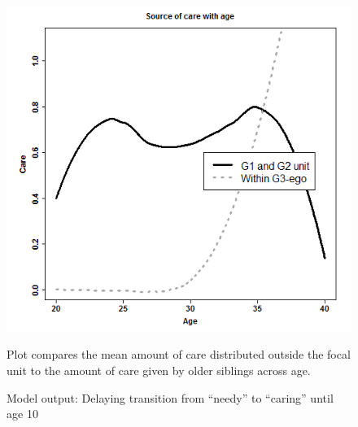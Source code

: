 \documentclass[10pt]{article}
\begin{document}
\begin{figure}[h]
\caption{Model output: Delaying transition from ``needy'' to ``caring'' until age 10} \label{fig:supp33} 
    \centering
    \includegraphics[scale=0.65]{need_till_10}

{Plot compares the mean amount of care distributed outside the focal unit to the amount of care given by older siblings across age.}
\end{figure}
\end{document}
